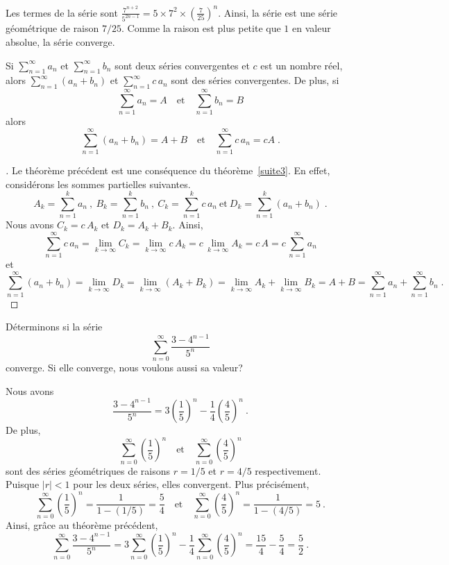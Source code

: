 {\begin{egg}
Les termes de la série sont
$\displaystyle \frac{7^{n+2}}{5^{2n-1}} = 5\times 7^2 \times
\left(\frac{7}{25}\right)^n$.  Ainsi, la série est une série
géométrique de raison $7/25$.  Comme la raison est plus petite que $1$
en valeur absolue, la série converge.
\end{egg}

\begin{focus}{\thm}
Si $\displaystyle \sum_{n=1}^\infty a_n$ et
$\displaystyle \sum_{n=1}^\infty b_n$ sont deux séries convergentes et
$c$ est un nombre réel, alors
$\displaystyle \sum_{n=1}^\infty (a_n+b_n)$ et
$\displaystyle \sum_{n=1}^\infty c\, a_n$ sont des séries convergentes.
De plus, si
\[
\sum_{n=1}^\infty a_n = A \quad \text{et} \quad \sum_{n=1}^\infty b_n = B
\]
alors
\[
\sum_{n=1}^\infty (a_n+b_n) = A+B \quad \text{et}
\quad \sum_{n=1}^\infty c\, a_n = cA \; .
\]
\label{series_linear}
\end{focus}

\begin{proof}[\theory]
Le théorème précédent est une conséquence du théorème~\ref{suite3}.
En effet, considérons les sommes partielles suivantes.
\[
A_k = \sum_{n=1}^k a_n \ , \ 
B_k = \sum_{n=1}^k b_n \ , \ C_k = \sum_{n=1}^k c\,a_n
\ \text{et} \ D_k = \sum_{n=1}^k (a_n+b_n) \; .
\]
Nous avons $C_k = c\,A_k$ et $D_k = A_k + B_k$.  Ainsi,
\[
\sum_{n=1}^\infty c\,a_n = \lim_{k\rightarrow \infty} C_k
= \lim_{k\rightarrow \infty} c\,A_k
= c\,\lim_{k\rightarrow \infty} A_k = c\, A
= c\, \sum_{n=1}^\infty a_n
\]
et
\[
\sum_{n=1}^\infty (a_n+b_n) = \lim_{k\rightarrow \infty} D_k
= \lim_{k\rightarrow \infty} (A_k + B_k)
= \lim_{k\rightarrow \infty} A_k + \lim_{k\rightarrow \infty} B_k
= A + B
= \sum_{n=1}^\infty a_n + \sum_{n=1}^\infty b_n
\; .
\]
\end{proof}

\begin{egg}[\eng]
Déterminons si la série
\[
\sum_{n=0}^\infty \frac{3-4^{n-1}}{5^n}
\]
converge.  Si elle converge, nous voulons aussi sa valeur?

Nous avons
\[
\frac{3-4^{n-1}}{5^n} =
3 \left( \frac{1}{5}\right)^n - \frac{1}{4} \left(\frac{4}{5}\right)^n \ .
\]
De plus,
\[
\sum_{n=0}^\infty \left( \frac{1}{5} \right)^n \quad \text{et}
\quad \sum_{n=0}^\infty \left( \frac{4}{5} \right)^n
\]
sont des séries géométriques de raisons $r = 1/5$ et $r = 4/5$
respectivement. Puisque $|r|<1$ pour les deux séries, elles
convergent.  Plus précisément,
\[
\sum_{n=0}^\infty \left( \frac{1}{5} \right)^n = \frac{1}{1-(1/5)} =
\frac{5}{4} \quad \text{et} \quad
\sum_{n=0}^\infty \left( \frac{4}{5} \right)^n = \frac{1}{1-(4/5)} = 5 \ .
\]
Ainsi, grâce au théorème précédent,
\[
\sum_{n=0}^\infty \frac{3-4^{n-1}}{5^n}
= 3 \sum_{n=0}^\infty \left( \frac{1}{5} \right)^n - \frac{1}{4}
\sum_{n=0}^\infty \left( \frac{4}{5} \right)^n
= \frac{15}{4} - \frac{5}{4} = \frac{5}{2} \ .
\]
\end{egg}

}
